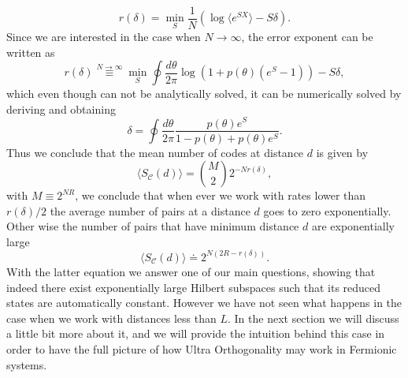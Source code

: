 \begin{equation}
r(\delta) = \min_{S} \frac{1}{N} \left(\log\langle e^{SX}\rangle - S\delta\right).
\end{equation}
\indent Since we are interested in the case when $N\to \infty$, the error exponent can be written as
\begin{equation}
r(\delta)\stackrel{N\to \infty}{\equiv}\min_{S}\oint \frac{d\theta}{2\pi}\log\left(1+p(\theta)(e^S -1)\right) -S\delta,
\label{CH2:Error_exponent}
\end{equation}
which even though can not be analytically solved, it can be numerically solved by deriving and obtaining
\begin{equation}
\delta = \oint \frac{d\theta}{2\pi} \frac{p(\theta)e^{S}}{1-p(\theta) + p(\theta)e^S}.
\end{equation}
\indent Thus we conclude that the mean number of codes at distance $d$ is given by
\begin{equation}
\langle S_{\mathcal{C}}(d)\rangle = {M \choose 2} 2^{-Nr(\delta)},
\end{equation}
with $M\equiv 2^{NR}$, we conclude that when ever we work with rates lower than $r(\delta)/2$ the average number of pairs at a distance $d$ goes to zero exponentially. Other wise the number of pairs that have minimum distance $d$ are exponentially large
\begin{equation}
\langle S_{\mathcal{C}}(d)\rangle \doteq  2^{N(2R-r(\delta))}.
\end{equation}
\indent With the latter equation we answer one of our main questions, showing that indeed there exist exponentially large Hilbert subspaces such that its reduced states are automatically constant. However we have not seen what happens in the case when we work with distances less than $L$. In the next section we will discuss a little bit more about it, and we will provide the intuition behind this case in order to have the full picture of how Ultra Orthogonality may work in Fermionic systems.
